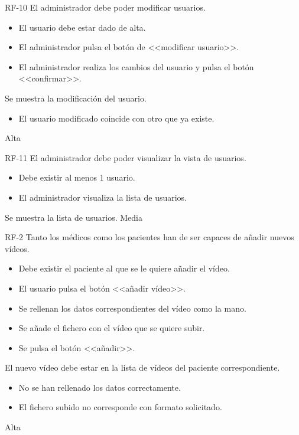 {RF-10}
{El administrador debe poder modificar usuarios.}
{	\begin{itemize}
	\def\labelenumi{\arabic{enumi}.}
	\tightlist
	\item El usuario debe estar dado de alta.
	\end{itemize}}
{
	\begin{itemize}
	\def\labelenumi{\arabic{enumi}.}
	\tightlist

    \item El administrador pulsa el botón de <<modificar usuario>>.
    \item El administrador realiza los cambios del usuario y pulsa el botón <<confirmar>>.
    \end{itemize}
}
{Se muestra la modificación del usuario.}
{\begin{itemize}
	\def\labelenumi{\arabic{enumi}.}
	\tightlist

    \item El usuario modificado coincide con otro que ya existe.
    \end{itemize}}
{Alta}

{RF-11}
{El administrador debe poder visualizar la vista de usuarios.}
{	\begin{itemize}
	\def\labelenumi{\arabic{enumi}.}
	\tightlist
	\item Debe existir al menos 1 usuario.
	\end{itemize}}
{
	\begin{itemize}
	\def\labelenumi{\arabic{enumi}.}
	\tightlist

    \item El administrador visualiza la lista de usuarios.
    \end{itemize}
}
{Se muestra la lista de usuarios.}
{}
{Media}

{RF-2}
{Tanto los médicos como los pacientes han de ser capaces de añadir nuevos vídeos.}
{	\begin{itemize}
	\def\labelenumi{\arabic{enumi}.}
	\tightlist
	\item Debe existir el paciente al que se le quiere añadir el vídeo.
	\end{itemize}}
{
	\begin{itemize}
	\def\labelenumi{\arabic{enumi}.}
	\tightlist

    \item El usuario pulsa el botón <<añadir vídeo>>.
    \item Se rellenan los datos correspondientes del vídeo como la mano.
    \item Se añade el fichero con el vídeo que se quiere subir.
    \item Se pulsa el botón <<añadir>>.
    \end{itemize}
}
{El nuevo vídeo debe estar en la lista de vídeos del paciente correspondiente.}
{\begin{itemize}
	\def\labelenumi{\arabic{enumi}.}
	\tightlist
	\item No se han rellenado los datos correctamente.
	\item El fichero subido no corresponde con formato solicitado.
	\end{itemize}}
{Alta}

